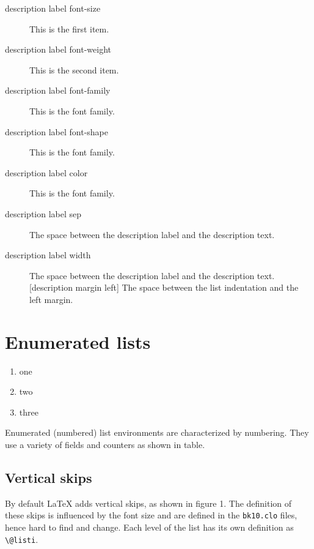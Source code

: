 \begin{description}
\item[description label font-size]This is the first item.
\item[description label font-weight]This is the second item. \lipsum*[1]
\item[description label font-family] This is the font family.
\item[description label font-shape] This is the font family.
\item[description label color] This is the font family.
\item[description label sep] The space between the description label and the description text.
\item [description label width] The space between the description label and the description text.
[description margin left] The space between the list indentation and the left margin.
\lipsum*[3]
\end{description}


\section{Enumerated lists}


\begin{enumerate}
\item one
\item two
\item three
\end{enumerate}

Enumerated (numbered) list environments are characterized by numbering. They use a variety of fields and counters as shown in table.

\subsection{Vertical skips}

By default LaTeX adds vertical skips, as shown in figure 1. The definition of these skips is influenced by the font size and are defined in the \texttt{bk10.clo} files, hence hard to find and change. Each level of the list has its own definition as \lstinline{\@listi}.

\bigskip
{}

